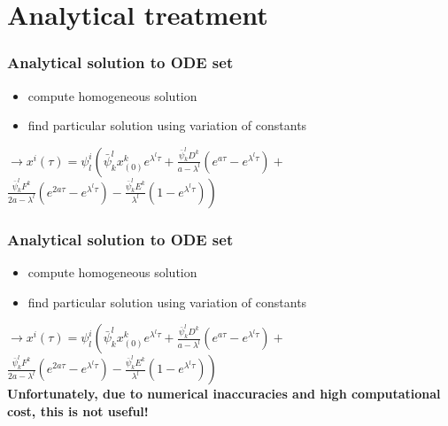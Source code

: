 \documentclass{beamer}
\begin{document}
\section{Analytical treatment}
\begin{frame}
\frametitle{Analytical solution to ODE set}
\vspace{-1cm}
\begin{itemize}
	\item compute homogeneous solution \newline
	\item find particular solution using variation of constants\newline
\end{itemize}

$\rightarrow x^i(\tau) =   \psi^i_l  \left(\bar{\psi}^l_k x^k_{(0)}e^{\lambda^l \tau} + \frac{\bar{\psi}^l_k D^k}{a-\lambda^l}(e^{a\tau}-e^{\lambda^l\tau}) + \right.$\\
\vspace{0.5cm}
\hspace{1.5cm}$\left. \frac{\bar{\psi}^l_k F^k}{2a-\lambda^l}(e^{2a\tau}-e^{\lambda^l\tau})-\frac{\bar{\psi}^l_k E^k}{\lambda^l}(1-e^{\lambda^l\tau}) \right)$
\end{frame}

\begin{frame}[noframenumbering]
\frametitle{Analytical solution to ODE set}
\vspace{-1cm}
\begin{itemize}
	\item compute homogeneous solution \newline
	\item find particular solution using variation of constants\newline
\end{itemize}

$\rightarrow x^i(\tau) =   \psi^i_l  \left(\bar{\psi}^l_k x^k_{(0)}e^{\lambda^l \tau} + \frac{\bar{\psi}^l_k D^k}{a-\lambda^l}(e^{a\tau}-e^{\lambda^l\tau}) + \right.$\\
\vspace{0.5cm}
\hspace{1.5cm}$\left. \frac{\bar{\psi}^l_k F^k}{2a-\lambda^l}(e^{2a\tau}-e^{\lambda^l\tau})-\frac{\bar{\psi}^l_k E^k}{\lambda^l}(1-e^{\lambda^l\tau}) \right)$
\vspace{0.5cm}\\
\textbf{Unfortunately, due to numerical inaccuracies and high computational cost, this is not useful!}
\end{frame}
\end{document}
